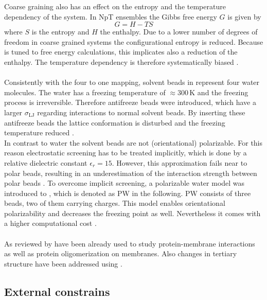 Coarse graining also has an effect on the entropy and the temperature dependency of the system. In NpT ensembles the Gibbs free energy $G$ is given by
\begin{equation}
G = H - T S
\end{equation}
where $S$ is the entropy and $H$ the enthalpy. Due to a lower number of degrees of freedom in coarse grained systems the configurational entropy is reduced. Because \martini{} is tuned to free energy calculations, this implicates also a reduction of the enthalpy. The temperature dependency is therefore systematically biased \autocite{martini22_check}.\\ 
\\
Consistently with the four to one mapping, solvent beads in \martini{} represent four water molecules. The \martini{} water has a freezing temperature of $\approx 300\,\si{\kelvin}$ and the freezing process is irreversible. Therefore antifreeze beads were introduced, which have a larger $\sigma_\text{LJ}$ regarding interactions to normal solvent beads. By inserting these antifreeze beads the lattice conformation is disturbed and the freezing temperature reduced \autocite{martini}.\\
In contrast to water the solvent beads are not (orientational) polarizable. For this reason electrostatic screening has to be treated implicitly, which is done by a relative dielectric constant $\epsilon_r = 15$. However, this approximation fails near to polar beads, resulting in an underestimation of the interaction strength between polar beads \autocite{martini22_check}. %
To overcome implicit screening, a polarizable water model was introduced to \martini{}, which is denoted as PW in the following. PW consists of three beads, two of them carrying charges. This model enables orientational polarizability and decreases the freezing point as well. Nevertheless it comes with a higher computational cost \autocite{polarizableMartini}.\\
\\
As reviewed by \textcite{martini22_check} \martini{} have been already used to study protein-membrane interactions as well as protein oligomerization on membranes. Also changes in tertiary structure have been addressed using \martini{}.%
\subsection{External constrains}
